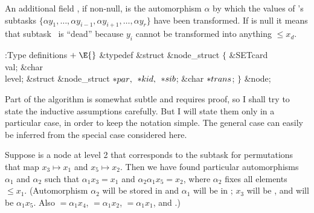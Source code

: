 An additional field , if non-null, is the automorphism $%
\alpha$ by
which the values of 's subtasks $\{\alpha y_1,\ldots,\alpha y_{i-1},
\alpha y_{i+1},\ldots,\alpha y_r\}$ have been transformed. If 
is null it means that subtask~ is ``dead'' because $y_i$ cannot be
transformed into anything $\le x_d$.

\Y\B\4:Type definitions\X${}\mathrel+\E{}$\6
\&{typedef} \&{struct} \&{node\_struct} ${}\{{}$\1\6
\&{SETcard} \\{val};\6
\&{char} \\{level};\6
\&{struct} \&{node\_struct} ${}{*}\\{par},{}$ ${}{*}\\{kid},{}$ ${}{*}%
\\{sib}{}$;\6
\&{char} ${}{*}\\{trans}{}$;\2\6
${}\}{}$ \&{node};\par
\fi

Part of the algorithm is somewhat subtle and requires
proof, so I shall try
to state the inductive assumptions carefully. But I will state them only in a
particular case, in order to keep the notation simple. The general case can
easily be inferred from the special case considered here.

Suppose  is a node at level 2 that corresponds to the subtask for
permutations that map $x_3\mapsto x_1$ and $x_5\mapsto x_2$. Then we have
found particular
automorphisms $\alpha_1$ and $\alpha_2$ such that $\alpha_1 x_3=x_1$
and $\alpha_2\alpha_1 x_5=x_2$, where $\alpha_2$ fixes all elements $\le x_1$.
(Automorphism $\alpha_2$ will be stored in  and $%
\alpha_1$ will
be in ; $x_3$ will be , and  will
be $\alpha_1x_5$. Also
${}=\alpha_1x_4$,
${}=\alpha_1x_2$,
${}=\alpha_1x_1$, and
.)

